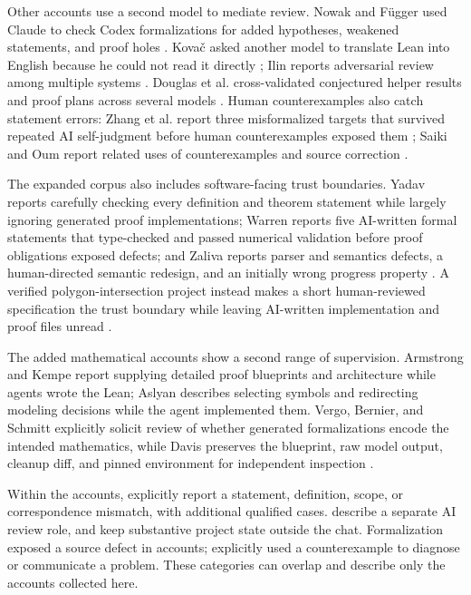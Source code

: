 \documentclass{article}
\begin{document}
Other accounts use a second model to mediate review.  Nowak and F\"ugger used
Claude to check Codex formalizations for added hypotheses, weakened statements,
and proof holes \citep{nowak2026workflow}.  Kova\v{c} asked another model to
translate Lean into English because he could not read it directly
\citep{kovac2025erdos189}; Ilin reports adversarial review among multiple systems
\citep{ilin2026vml}.  Douglas et al. cross-validated conjectured helper results
and proof plans across several models \citep{douglas2026qft}.  Human
counterexamples also catch statement errors: Zhang et al. report three
misformalized targets that survived repeated AI self-judgment before human
counterexamples exposed them \citep{zhang2026slt}; Saiki and Oum report related
uses of counterexamples and source correction
\citep{saiki2026double,oum2026preprint}.

The expanded corpus also includes software-facing trust boundaries.  Yadav
reports carefully checking every definition and theorem statement while largely
ignoring generated proof implementations; Warren reports five AI-written formal
statements that type-checked and passed numerical validation before proof
obligations exposed defects; and Zaliva reports parser and semantics defects, a
human-directed semantic redesign, and an initially wrong progress property
\citep{yadav2026verification,warren2026tessera,zaliva2026semantics}.  A verified
polygon-intersection project instead makes a short human-reviewed specification
the trust boundary while leaving AI-written implementation and proof files
unread \citep{schildep2026polygon}.

The added mathematical accounts show a second range of supervision.  Armstrong
and Kempe report supplying detailed proof blueprints and architecture while
agents wrote the Lean; Aslyan describes selecting symbols and redirecting
modeling decisions while the agent implemented them.  Vergo, Bernier, and
Schmitt explicitly solicit review of whether generated formalizations encode
the intended mathematics, while Davis preserves the blueprint, raw model output,
cleanup diff, and pinned environment for independent inspection
\citep{armstrong2026degiorgi,aslyan2026friedberg,vergo2025aiproofs,
bernier2026classfield,schmitt2025extremal,davis2026gdlean}.

Within the \PractitionerAccountCount{} accounts, \AccountSemanticMismatchCount{}
explicitly report a statement, definition, scope, or correspondence mismatch,
with \AccountSemanticMismatchQualifiedCount{} additional qualified cases.
\AccountSeparateAIReviewCount{} describe a separate AI review role, and
\AccountPersistentStateCount{} keep substantive project state outside the chat.
Formalization exposed a source defect in \AccountSourceDefectCount{} accounts;
\AccountCounterexampleCount{} explicitly used a counterexample to diagnose or
communicate a problem.  These categories can overlap and describe only the
accounts collected here.
\end{document}
